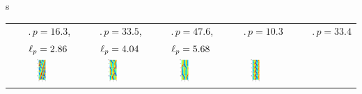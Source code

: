 \documentclass{beamer}
\begin{document}
\begin{frame}{\Rpo s}


\scriptsize
 \begin{tabular}{ccccc} 
~~~$\period{p} = 16.3$, & ~~~$\period{p} = 33.5$,  & ~~~$\period{p} = 47.6$,  &
~~~$\period{p} = 10.3$ & ~~~$\period{p} = 33.4$\\
~~~$\ell_p = 2.86$ & ~~~$\ell_p = 4.04$ & ~~~$\ell_p = 5.68$ & 
&\\
\includegraphics[width=0.15\textwidth]{../../figs/ks22rpo016.3-02.86.eps}\hspace{-3ex} &
\includegraphics[width=0.15\textwidth]{../../figs/ks22rpo033.5-04.04.eps}\hspace{-3ex} &
\includegraphics[width=0.15\textwidth]{../../figs/ks22rpo047.6-05.68.eps}\hspace{-3ex} &
\includegraphics[width=0.15\textwidth]{../../figs/ks22rpo020.5-00.00.eps}\hspace{-3ex} &

\end{tabular}
\end{frame}
\end{document}
